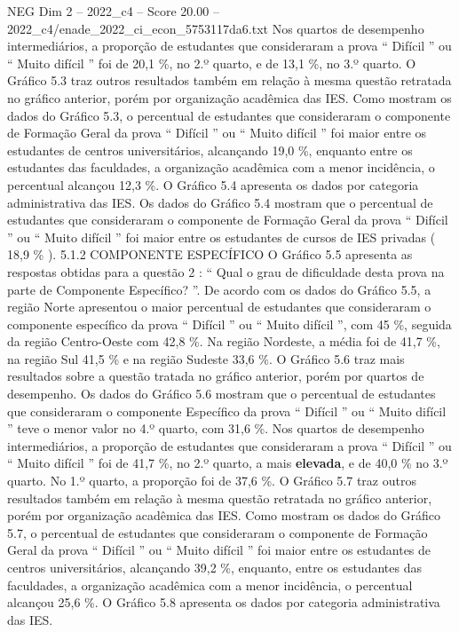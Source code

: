 \begin{textsample}{NEG Dim 2 – 2022\_c4 – Score 20.00 – 2022\_c4/enade\_2022\_ci\_econ\_5753117da6.txt}
Nos quartos de desempenho intermediários, a proporção de estudantes que consideraram a prova “ Difícil ” ou “ Muito difícil ” foi de 20,1 \%, no 2.º quarto, e de 13,1 \%, no 3.º quarto.
O Gráfico 5.3 traz outros resultados também em relação à mesma questão retratada no gráfico anterior, porém por organização acadêmica das IES.
Como mostram os dados do Gráfico 5.3, o percentual de estudantes que consideraram o componente de Formação Geral da prova “ Difícil ” ou “ Muito difícil ” foi maior entre os estudantes de centros universitários, alcançando 19,0 \%, enquanto entre os estudantes das faculdades, a organização acadêmica com a menor incidência, o percentual alcançou 12,3 \%.
O Gráfico 5.4 apresenta os dados por categoria administrativa das IES.
Os dados do Gráfico 5.4 mostram que o percentual de estudantes que consideraram o componente de Formação Geral da prova “ Difícil ” ou “ Muito difícil ” foi maior entre os estudantes de cursos de IES privadas ( 18,9 \% ). 5.1.2 COMPONENTE ESPECÍFICO O Gráfico 5.5 apresenta as respostas obtidas para a questão 2 : “ Qual o grau de dificuldade desta prova na parte de Componente Específico? ”.
De acordo com os dados do Gráfico 5.5, a região Norte apresentou o maior percentual de estudantes que consideraram o componente específico da prova “ Difícil ” ou “ Muito difícil ”, com 45 \%, seguida da região Centro-Oeste com 42,8 \%.
Na região Nordeste, a média foi de 41,7 \%, na região Sul 41,5 \% e na região Sudeste 33,6 \%.
O Gráfico 5.6 traz mais resultados sobre a questão tratada no gráfico anterior, porém por quartos de desempenho.
Os dados do Gráfico 5.6 mostram que o percentual de estudantes que consideraram o componente Específico da prova “ Difícil ” ou “ Muito difícil ” teve o menor valor no 4.º quarto, com 31,6 \%.
Nos quartos de desempenho intermediários, a proporção de estudantes que consideraram a prova “ Difícil ” ou “ Muito difícil ” foi de 41,7 \%, no 2.º quarto, a mais \textbf{elevada}, e de 40,0 \% no 3.º quarto.
No 1.º quarto, a proporção foi de 37,6 \%.
O Gráfico 5.7 traz outros resultados também em relação à mesma questão retratada no gráfico anterior, porém por organização acadêmica das IES.
Como mostram os dados do Gráfico 5.7, o percentual de estudantes que consideraram o componente de Formação Geral da prova “ Difícil ” ou “ Muito difícil ” foi maior entre os estudantes de centros universitários, alcançando 39,2 \%, enquanto, entre os estudantes das faculdades, a organização acadêmica com a menor incidência, o percentual alcançou 25,6 \%.
O Gráfico 5.8 apresenta os dados por categoria administrativa das IES.

\end{textsample}
